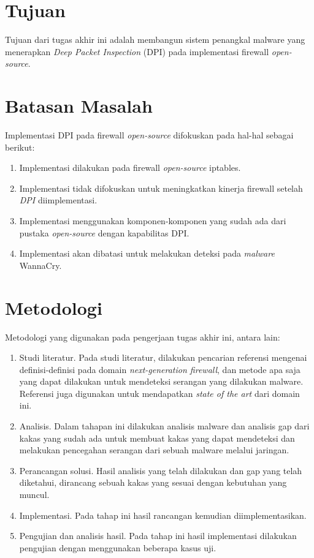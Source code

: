 \section{Tujuan}
Tujuan dari tugas akhir ini adalah membangun sistem penangkal malware yang menerapkan \textit{Deep Packet Inspection} (DPI) pada implementasi firewall \textit{open-source}.

\section{Batasan Masalah}
Implementasi DPI pada firewall \textit{open-source} difokuskan pada hal-hal sebagai berikut:
\begin{enumerate}
	\item Implementasi dilakukan pada firewall \textit{open-source} iptables.
	\item Implementasi tidak difokuskan untuk meningkatkan kinerja firewall setelah \textit{DPI} diimplementasi.
	\item Implementasi menggunakan komponen-komponen yang sudah ada dari pustaka \textit{open-source} dengan kapabilitas DPI.
	\item Implementasi akan dibatasi untuk melakukan deteksi pada \textit{malware} WannaCry.
\end{enumerate}

\section{Metodologi}
Metodologi yang digunakan pada pengerjaan tugas akhir ini, antara lain:
\begin{enumerate}
	\item Studi literatur. Pada studi literatur, dilakukan pencarian referensi mengenai
	definisi-definisi pada domain \textit{next-generation firewall}, dan metode apa saja yang dapat 
	dilakukan untuk mendeteksi serangan yang dilakukan malware. Referensi juga
	digunakan untuk mendapatkan \textit{state of the art} dari domain ini.
	\item Analisis. Dalam tahapan ini dilakukan analisis malware dan analisis gap dari
	kakas yang sudah ada untuk membuat kakas yang dapat mendeteksi dan melakukan pencegahan
	serangan dari sebuah malware melalui jaringan.
	\item Perancangan solusi. Hasil analisis yang telah dilakukan dan gap yang telah diketahui,
	dirancang sebuah kakas yang sesuai dengan kebutuhan yang muncul.
	\item Implementasi. Pada tahap ini hasil rancangan kemudian diimplementasikan.
	\item Pengujian dan analisis hasil. Pada tahap ini hasil implementasi dilakukan
	pengujian dengan menggunakan beberapa kasus uji.
\end{enumerate}
